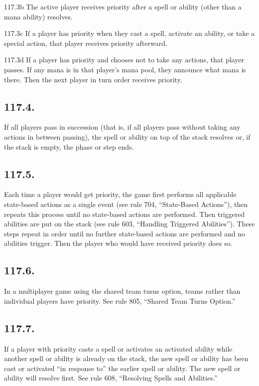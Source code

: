117.3b The active player receives priority after a spell or ability (other than a mana ability) resolves.

117.3c If a player has priority when they cast a spell, activate an ability, or take a special action, that player receives priority afterward.

117.3d If a player has priority and chooses not to take any actions, that player passes. If any mana is in that player’s mana pool, they announce what mana is there. Then the next player in turn order receives priority.

\subsection*{117.4.}
If all players pass in succession (that is, if all players pass without taking any actions in between passing), the spell or ability on top of the stack resolves or, if the stack is empty, the phase or step ends.

\subsection*{117.5.}
Each time a player would get priority, the game first performs all applicable state-based actions as a single event (see rule 704, “State-Based Actions”), then repeats this process until no state-based actions are performed. Then triggered abilities are put on the stack (see rule 603, “Handling Triggered Abilities”). These steps repeat in order until no further state-based actions are performed and no abilities trigger. Then the player who would have received priority does so.

\subsection*{117.6.}
In a multiplayer game using the shared team turns option, teams rather than individual players have priority. See rule 805, “Shared Team Turns Option.”

\subsection*{117.7.}
If a player with priority casts a spell or activates an activated ability while another spell or ability is already on the stack, the new spell or ability has been cast or activated “in response to” the earlier spell or ability. The new spell or ability will resolve first. See rule 608, “Resolving Spells and Abilities.”

